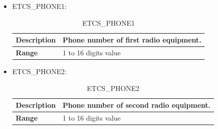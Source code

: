 \documentclass{template/openetcs}
\begin{document}
\begin{itemize}
		\item ETCS\_PHONE1:
										
			\begin{longtable}{|l|l|}
				\caption{ETCS\_PHONE1}\\ 
				\hline
				
					\begin{minipage}[t]{0.22\linewidth} \textbf{Description}	\end{minipage} 
				&	\begin{minipage}[t]{0.78\linewidth} Phone number of first radio equipment. \end{minipage} \\
				
				\hline
																																									
					\begin{minipage}[t]{0.22\linewidth} \textbf{Range}	\end{minipage} 
				&	\begin{minipage}[t]{0.78\linewidth} 1 to 16 digits value \end{minipage} \\				
				
				\hline
				
			\end{longtable}
			
		\item ETCS\_PHONE2:
											
			\begin{longtable}{|l|l|}
				\caption{ETCS\_PHONE2}\\ 
				\hline
				
					\begin{minipage}[t]{0.22\linewidth} \textbf{Description}	\end{minipage} 
				&	\begin{minipage}[t]{0.78\linewidth} Phone number of second radio equipment. \end{minipage} \\
				
				\hline
																																									
					\begin{minipage}[t]{0.22\linewidth} \textbf{Range}	\end{minipage} 
				&	\begin{minipage}[t]{0.78\linewidth} 1 to 16 digits value \end{minipage} \\				
				

\end{longtable}
\end{itemize}
\end{document}
